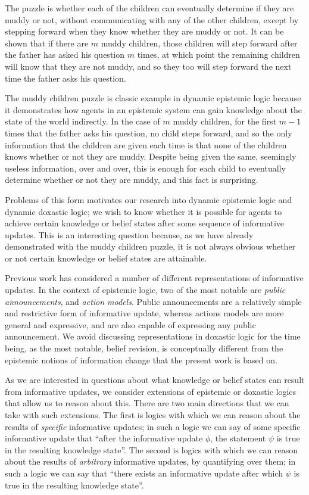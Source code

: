The puzzle is whether each of the children can eventually determine if they are
muddy or not, without communicating with any of the other children, except by
stepping forward when they know whether they are muddy or not. It can be shown
that if there are $m$ muddy children, those children will step forward after the
father has asked his question $m$ times, at which point the remaining children
will know that they are not muddy, and so they too will step forward the next
time the father asks his question.

The muddy children puzzle is classic example in dynamic epistemic logic because
it demonstrates how agents in an epistemic system can gain knowledge about the
state of the world indirectly. In the case of $m$ muddy children, for the first
$m - 1$ times that the father asks his question, no child steps forward, and so
the only information that the children are given each time is that none of the
children knows whether or not they are muddy. Despite being given the same,
seemingly useless information, over and over, this is enough for each child to
eventually determine whether or not they are muddy, and this fact is surprising.

Problems of this form motivates our research into dynamic epistemic logic and
dynamic doxastic logic; we wish to know whether it is possible for agents to
achieve certain knowledge or belief states after some sequence of informative
updates. This is an interesting question because, as we have already
demonstrated with the muddy children puzzle, it is not always obvious whether or
not certain knowledge or belief states are attainable. %

Previous work has considered a number of different representations of
informative updates. In the context of epistemic logic, two of the most notable
are {\em public announcements}, and {\em action models}. Public announcements
are a relatively simple and restrictive form of informative update, whereas
actions models are more general and expressive, and are also capable of
expressing any public announcement. We avoid discussing representations in
doxastic logic for the time being, as the most notable, belief revision, is
conceptually different from the epistemic notions of information change that
the present work is based on.

As we are interested in questions about what knowledge or belief states can
result from informative updates, we consider extensions of epistemic or doxastic
logics that allow us to reason about this. There are two main directions that we
can take with such extensions. The first is logics with which we can reason
about the results of {\em specific} informative updates; in such a logic we can
say of some specific informative update that ``after the informative update
$\phi$, the statement $\psi$ is true in the resulting knowledge state''. The
second is logics with which we can reason about the results of {\em arbitrary}
informative updates, by quantifying over them; in such a logic we can say
that ``there exists an informative update after which $\psi$ is true in the
resulting knowledge state''.

